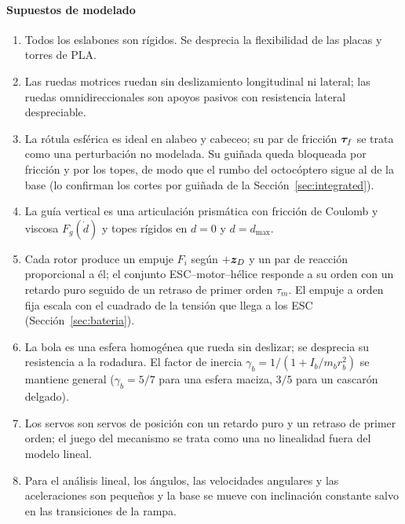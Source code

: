 \paragraph{Supuestos de modelado}
\begin{enumerate}[label=\textbf{A\arabic*.}, leftmargin=*]
  \item Todos los eslabones son rígidos. Se desprecia la flexibilidad de las placas y torres de PLA.
  \item Las ruedas motrices ruedan sin deslizamiento longitudinal ni lateral; las ruedas omnidireccionales son apoyos pasivos con resistencia lateral despreciable.
  \item La rótula esférica es ideal en alabeo y cabeceo; su par de fricción $\bm{\tau}_f$ se trata como una perturbación no modelada. Su guiñada queda bloqueada por fricción y por los topes, de modo que el rumbo del octocóptero sigue al de la base (lo confirman los cortes por guiñada de la Sección~\ref{sec:integrated}).
  \item La guía vertical es una articulación prismática con fricción de Coulomb y viscosa $F_g(\dot d)$ y topes rígidos en $d=0$ y $d=d_{\max}$.
  \item Cada rotor produce un empuje $F_i$ según $+\bm{z}_D$ y un par de reacción proporcional a él; el conjunto ESC--motor--hélice responde a su orden con un retardo puro seguido de un retraso de primer orden $\tau_m$. El empuje a orden fija escala con el cuadrado de la tensión que llega a los ESC (Sección~\ref{sec:bateria}).
  \item La bola es una esfera homogénea que rueda sin deslizar; se desprecia su resistencia a la rodadura. El factor de inercia $\gamma_b=1/(1+I_b/m_br_b^2)$ se mantiene general ($\gamma_b=5/7$ para una esfera maciza, $3/5$ para un cascarón delgado).
  \item Los servos son servos de posición con un retardo puro y un retraso de primer orden; el juego del mecanismo se trata como una no linealidad fuera del modelo lineal.
  \item Para el análisis lineal, los ángulos, las velocidades angulares y las aceleraciones son pequeños y la base se mueve con inclinación constante salvo en las transiciones de la rampa.
\end{enumerate}


